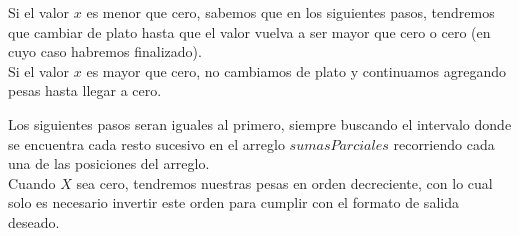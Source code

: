 Si el valor $x$ es menor que cero, sabemos que en los siguientes pasos, tendremos que cambiar de plato hasta que el valor vuelva a ser mayor que cero o cero (en cuyo caso habremos finalizado).\\

Si el valor $x$ es mayor que cero, no cambiamos de plato y continuamos agregando pesas hasta llegar a cero.

Los siguientes pasos seran iguales al primero, siempre buscando el intervalo donde se encuentra cada resto sucesivo en el arreglo $sumasParciales$ recorriendo cada una de las posiciones del arreglo.\\

Cuando $X$ sea cero, tendremos nuestras pesas en orden decreciente, con lo cual solo es necesario invertir este orden para cumplir con el formato de salida deseado.
